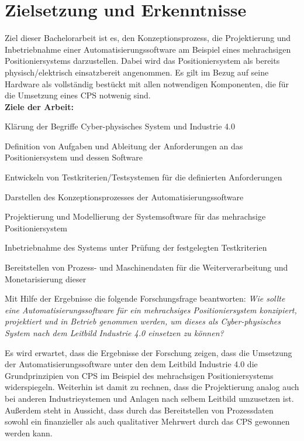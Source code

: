 \documentclass[12pt, a4paper, twoside]{article} %
\begin{document}
\section{Zielsetzung und Erkenntnisse}
Ziel dieser Bachelorarbeit ist es, den Konzeptionsprozess, die Projektierung und Inbetriebnahme einer Automatisierungssoftware am Beispiel eines mehrachsigen Positioniersystems darzustellen. Dabei wird das Positioniersystem als bereits physisch/elektrisch einsatzbereit angenommen. Es gilt im Bezug auf seine Hardware als vollständig bestückt mit allen notwendigen Komponenten, die für die Umsetzung eines CPS notwenig sind. \\
\textbf{Ziele der Arbeit:}
\begin{compactitem}
	\item Klärung der Begriffe Cyber-physisches System und Industrie 4.0
	\item Definition von Aufgaben und Ableitung der Anforderungen an das Positioniersystem und dessen Software
	\item Entwickeln von Testkriterien/Testsystemen für die definierten Anforderungen
	\item Darstellen des Konzeptionsprozesses der Automatisierungssoftware 
	\item Projektierung und Modellierung der Systemsoftware für das mehrachsige Positioniersystem
	\item Inbetriebnahme des Systems unter Prüfung der festgelegten Testkriterien
	\item Bereitstellen von Prozess- und Maschinendaten für die Weiterverarbeitung und Monetarisierung dieser
	\item Mit Hilfe der Ergebnisse die folgende Forschungsfrage beantworten: \textit{Wie sollte eine Automatisierungssoftware für ein mehrachsiges Positioniersystem konzipiert, projektiert und in Betrieb genommen werden, um dieses als Cyber-physisches System nach dem Leitbild Industrie 4.0 einsetzen zu können?}
\end{compactitem}
Es wird erwartet, dass die Ergebnisse der Forschung zeigen, dass die Umsetzung der Automatisierungssoftware unter den dem Leitbild Industrie 4.0 die Grundprinzipien von CPS im Beispiel des mehrachsigen Positioniersystems widerspiegeln. Weiterhin ist damit zu rechnen, dass die Projektierung analog auch bei anderen Industrieystemen und Anlagen nach selbem Leitbild umzusetzen ist. Außerdem steht in Aussicht, dass durch das Bereitstellen von Prozessdaten sowohl ein finanzieller als auch qualitativer Mehrwert durch das CPS gewonnen werden kann. 
\end{document}
